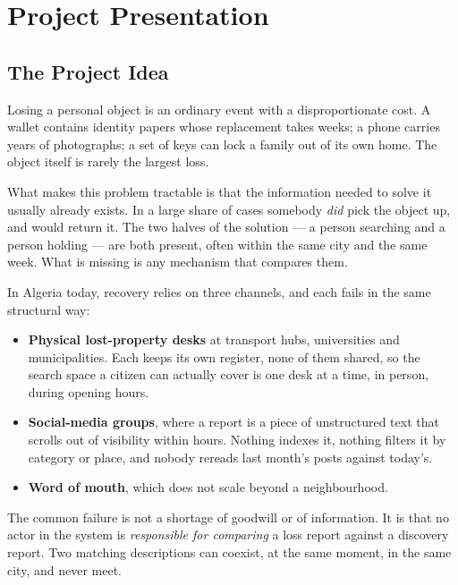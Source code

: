 \chapter{Project Presentation}
\label{ch:presentation}

\section{The Project Idea}

Losing a personal object is an ordinary event with a disproportionate cost. A
wallet contains identity papers whose replacement takes weeks; a phone carries
years of photographs; a set of keys can lock a family out of its own home. The
object itself is rarely the largest loss.

What makes this problem tractable is that the information needed to solve it
usually already exists. In a large share of cases somebody \emph{did} pick the
object up, and would return it. The two halves of the solution --- a person
searching and a person holding --- are both present, often within the same city
and the same week. What is missing is any mechanism that compares them.

In Algeria today, recovery relies on three channels, and each fails in the same
structural way:

\begin{itemize}[leftmargin=1.4em,itemsep=3pt]
  \item \textbf{Physical lost-property desks} at transport hubs, universities
        and municipalities. Each keeps its own register, none of them shared, so
        the search space a citizen can actually cover is one desk at a time, in
        person, during opening hours.
  \item \textbf{Social-media groups}, where a report is a piece of unstructured
        text that scrolls out of visibility within hours. Nothing indexes it,
        nothing filters it by category or place, and nobody rereads last month's
        posts against today's.
  \item \textbf{Word of mouth}, which does not scale beyond a neighbourhood.
\end{itemize}

The common failure is not a shortage of goodwill or of information. It is that
no actor in the system is \emph{responsible for comparing} a loss report against
a discovery report. Two matching descriptions can coexist, at the same moment,
in the same city, and never meet.

